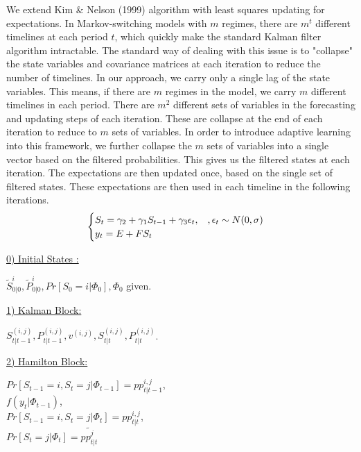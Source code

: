 \documentclass[12pt,reqno]{article}
\numberwithin{equation}{section}
\begin{document}
We extend Kim \& Nelson (1999) algorithm with least squares updating for expectations. In Markov-switching models with $ m $ regimes, there are $ m^t $ different timelines at each period $t$, which quickly make the standard Kalman filter algorithm intractable. The standard way of dealing with this issue is to "collapse" the state variables and covariance matrices at each iteration to reduce the number of timelines. In our approach, we carry only a single lag of the state variables. This means, if there are $ m $ regimes in the model, we carry $ m $ different timelines in each period. There are $ m^2 $ different sets of variables in the forecasting and updating steps of each iteration. These are collapse at the end of each iteration to reduce to $ m $ sets of variables. In order to introduce adaptive learning into this framework, we further collapse the $ m $ sets of variables into a single vector based on the filtered probabilities. This gives us the filtered states at each iteration. The expectations are then updated once, based on the single set of filtered states. These expectations are then used in each timeline in the following iterations. \\

$$
\begin{cases}
S_t = \gamma_2 + \gamma_1 S_{t-1} + \gamma_3 \epsilon_t, \hspace{3 mm}, \epsilon_t \sim N(0, \sigma) \\
y_t = E+ F S_t \\
\end{cases}
$$

\noindent
\underline{0) Initial  States :}

$ \tilde{S}_{0|0}^{i}, \tilde{P}_{0|0}^{i}, Pr[ S_0=i | \Phi_0] , \Phi_0$  given.\\
\vspace{6 mm}


\noindent
\underline{1) Kalman Block:} \\
\vspace{6 mm}

\noindent
$ S_{t|t-1}^{(i,j)}, P_{t|t-1}^{(i,j)}, v^{(i,j)}, S_{t|t}^{(i,j)}, P_{t|t}^{(i,j)} $. \\
\vspace{10 mm}

\noindent
\underline{2)  Hamilton Block:}\ \\
\vspace{6 mm}

\noindent
 $ Pr[S_{t-1}=i,S_t=j | \Phi_{t-1} ] = pp_{t|t-1}^{i,j} $,\\
$f(y_t|\Phi_{t-1}) $, \\
$Pr[S_{t-1}=i,S_t=j|\Phi_t]= pp_{t|t}^{i,j} $, \\
$Pr[S_t=j|\Phi_t]= \tilde{pp_{t|t}^{j}}$ \\
\vspace{5 mm}
\end{document}
